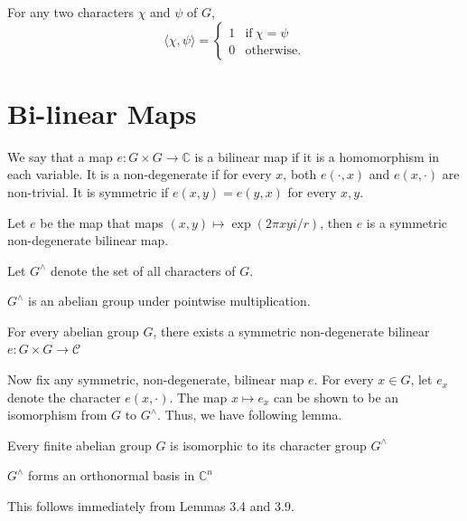 \begin{lemma}
For any two characters $\chi$ and $\psi$ of $G$, 
$$ \langle \chi, \psi \rangle =
\begin{cases}
	1             & \text{if} \ \chi = \psi \\
	0             & \text{otherwise}.
\end{cases} $$
\end{lemma}

\section{Bi-linear Maps}
\begin{definition}
We say that a map $e : G \times G  \rightarrow \mathbb{C}$ is a bilinear map if it is a homomorphism in each variable. It is a non-degenerate if for every $x$, both $e(\cdot, x)$ and $e(x, \cdot)$ are non-trivial. It is symmetric if $e(x,y) = e(y,x)$ for every $x, y$.
\end{definition}

\begin{lemma}
Let $e$ be the map that maps $(x,y) \mapsto \exp(2\pi xyi/r)$, then $e$ is a symmetric non-degenerate bilinear map.
\end{lemma}

\begin{definition}
Let $G^\land$ denote the set of all characters of $G$. 
\end{definition}

\begin{lemma}
$G^\land$ is an abelian group under pointwise multiplication. 
\end{lemma}

\begin{lemma}
For every abelian group $G$, there exists a symmetric non-degenerate bilinear $e : G \times G \rightarrow \mathcal{C}$ 
\end{lemma}

Now fix any symmetric, non-degenerate, bilinear map $e$. For every $x \in G$, let $e_x$ denote the character $e(x,\cdot)$. The map $x \mapsto e_x$ can be shown to be an isomorphism from $G$ to $G^\land$. Thus, we have following lemma.

\begin{lemma}
Every finite abelian group $G$ is isomorphic to its character group $G^\land$
\end{lemma}

\begin{theorem}
$G^\land$ forms an orthonormal basis in $\mathbb{C}^n$
\end{theorem}
This follows immediately from Lemmas 3.4 and 3.9.
